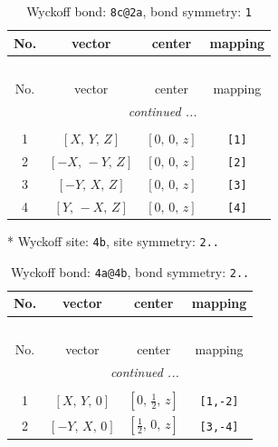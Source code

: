 \documentclass[fleqn,8pt]{jsarticle}
\begin{document}
\renewcommand{\arraystretch}{1.2}
\begin{longtable}{cccc}
\caption{Wyckoff bond: {\tt 8c@2a}, bond symmetry: {\tt 1}}
 \\
 \hline \hline
No. & vector & center & mapping \\ \hline \endfirsthead

\multicolumn{3}{l}{\tablename\ \thetable{}} \\
 \hline \hline
No. & vector & center & mapping \\ \hline \endhead

 \hline \hline
\multicolumn{3}{r}{\footnotesize\it continued ...} \\ \endfoot

 \hline \hline
\multicolumn{3}{r}{} \\ \endlastfoot

1 & $\left[ X,\, Y,\, Z \right]$ & $\left[ 0,\, 0,\, z \right]$ & {\tt [1]} \\ \hline
2 & $\left[ - X,\, - Y,\, Z \right]$ & $\left[ 0,\, 0,\, z \right]$ & {\tt [2]} \\ \hline
3 & $\left[ - Y,\, X,\, Z \right]$ & $\left[ 0,\, 0,\, z \right]$ & {\tt [3]} \\ \hline
4 & $\left[ Y,\, - X,\, Z \right]$ & $\left[ 0,\, 0,\, z \right]$ & {\tt [4]} \\
\end{longtable}
* Wyckoff site: {\tt 4b}, site symmetry: {\tt 2..}
\renewcommand{\arraystretch}{1.2}
\begin{longtable}{cccc}
\caption{Wyckoff bond: {\tt 4a@4b}, bond symmetry: {\tt 2..}}
 \\
 \hline \hline
No. & vector & center & mapping \\ \hline \endfirsthead

\multicolumn{3}{l}{\tablename\ \thetable{}} \\
 \hline \hline
No. & vector & center & mapping \\ \hline \endhead

 \hline \hline
\multicolumn{3}{r}{\footnotesize\it continued ...} \\ \endfoot

 \hline \hline
\multicolumn{3}{r}{} \\ \endlastfoot

1 & $\left[ X,\, Y,\, 0 \right]$ & $\left[ 0,\, \frac{1}{2},\, z \right]$ & {\tt [1,-2]} \\ \hline
2 & $\left[ - Y,\, X,\, 0 \right]$ & $\left[ \frac{1}{2},\, 0,\, z \right]$ & {\tt [3,-4]} \\
\end{longtable}
\end{document}
